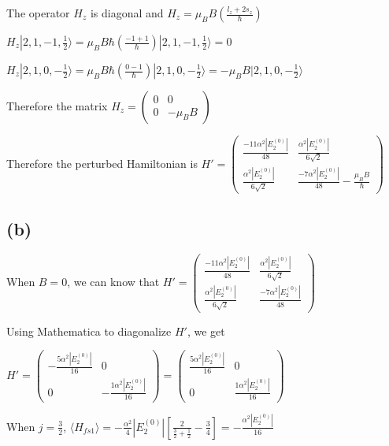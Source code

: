 \documentclass[12pt]{article}
\begin{document}
\begin{spacing}{2.0}
The operator $H_z$ is diagonal and $H_z=\mu_B B \left( \frac{l_z+2s_z}{\hbar} \right)$

$H_{z}|2,1,-1,\frac{1}{2}\rangle = \mu_B B \hbar \left( \frac{-1+1}{\hbar} \right) |2,1,-1,\frac{1}{2}\rangle = 0$

$H_{z}|2,1,0,-\frac{1}{2}\rangle = \mu_B B \hbar \left( \frac{0-1}{\hbar} \right) |2,1,0,-\frac{1}{2}\rangle = -\mu_B B |2,1,0,-\frac{1}{2}\rangle$

Therefore the matrix $H_z= \left(
\begin{array}{cc}
0 & 0\\
0 & -\mu_B B
\end{array}
\right)$

Therefore the perturbed Hamiltonian is $H'= \left(
\begin{array}{cc}
\frac{-11\alpha^2 |E_2^{(0)}|}{48} & \frac{\alpha^2 |E_2^{(0)}|}{6\sqrt{2}} \\
\frac{\alpha^2 |E_2^{(0)}|}{6\sqrt{2}} & \frac{-7\alpha^2 |E_2^{(0)}|}{48} -\frac{\mu_B B}{\hbar}
\end{array}
\right)$

\subsection*{(b)}

When $B=0$, we can know that $H'= \left(
\begin{array}{cc}
\frac{-11\alpha^2 |E_2^{(0)}|}{48} & \frac{\alpha^2 |E_2^{(0)}|}{6\sqrt{2}} \\
\frac{\alpha^2 |E_2^{(0)}|}{6\sqrt{2}} & \frac{-7\alpha^2 |E_2^{(0)}|}{48}
\end{array}
\right)$

Using Mathematica to diagonalize $H'$, we get

$H'= \left(
\begin{array}{cc}
-\frac{5\alpha^2 |E_2^{(0)}| }{16} & 0 \\
0 & -\frac{1 \alpha^2 |E_2^{(0)}|}{16 }
\end{array}
\right)= 
\left(
\begin{array}{cc}
\frac{5\alpha^2 |E_2^{(0)}| }{16} & 0 \\
0 & \frac{1 \alpha^2 |E_2^{(0)}|}{16 }
\end{array}
\right)$

When $j=\frac{3}{2}$, $\langle H_{fs1} \rangle = -\frac{\alpha^2}{4}|E_2^{(0)}| \left[ \frac{2}{\frac{3}{2}+ \frac{1}{2}} - \frac{3}{4} \right]= -\frac{\alpha^2|E_2^{(0)}|}{16} $


\end{spacing}
\end{document}
